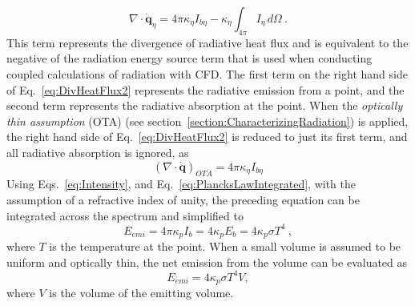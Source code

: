\begin{equation}
    \nabla \cdot \dot{\textbf{q}}_\eta{} = 4\pi\kappa{}_\eta{}I_{b\eta{}}-\kappa{}_{\eta{}}\int_{4\pi}I_\eta{}\,d\Omega \ .
    \label{eq:DivHeatFlux2}
\end{equation}
This term represents the divergence of radiative heat flux and is equivalent to the negative of the radiation energy source term that is used when conducting coupled calculations of radiation with CFD. The first term on the right hand side of Eq.~\ref{eq:DivHeatFlux2} represents the radiative emission from a point, and the second term represents the radiative absorption at the point.
When the \textit{optically thin assumption} (OTA) (see section~\ref{section:CharacterizingRadiation}) is applied, the right hand side of Eq.~\ref{eq:DivHeatFlux2} is reduced to just its first term, and all radiative absorption is ignored, as
\begin{equation}
    \left(\nabla \cdot \dot{\textbf{q}}\right)_{OTA} = 4\pi\kappa{}_\eta{}I_{b\eta{}}
    \label{eq:OTA}
\end{equation}
Using Eqs.~\ref{eq:Intensity}, and Eq.~\ref{eq:PlancksLawIntegrated}, with the assumption of a refractive index of unity, the preceding equation can be integrated across the spectrum and simplified to
\begin{equation}
    E_{emi} = 4\pi{}\kappa{}_pI_b = 4\kappa{}_pE_b = 4\kappa{}_p\sigma{}T^4 \ ,
    \label{eq:RademissionSimplified}
\end{equation}
where $T$ is the temperature at the point. When a small volume is assumed to be uniform and optically thin, the net emission from the volume can be evaluated as
\begin{equation}
    E_{emi} = 4\kappa{}_p\sigma{}T^4V ,
    \label{eq:EmissionFromVolume}
\end{equation}
where $V$ is the volume of the emitting volume.

